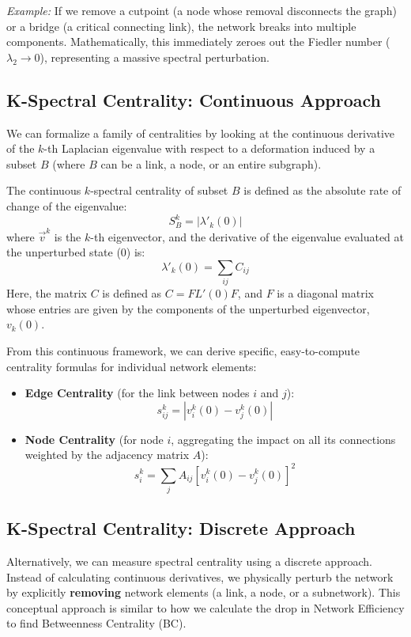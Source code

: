\textit{Example:} If we remove a cutpoint (a node whose removal disconnects the graph) or a bridge (a critical connecting link), the network breaks into multiple components. Mathematically, this immediately zeroes out the Fiedler number (\( \lambda_2 \rightarrow 0 \)), representing a massive spectral perturbation.

\subsection{K-Spectral Centrality: Continuous Approach}
We can formalize a family of centralities by looking at the continuous derivative of the \( k \)-th Laplacian eigenvalue with respect to a deformation induced by a subset \( B \) (where \( B \) can be a link, a node, or an entire subgraph).

The continuous \( k \)-spectral centrality of subset \( B \) is defined as the absolute rate of change of the eigenvalue:
\[
    S^k_B = |\lambda'_k(0)|
\]
where \( \vec{v}^k \) is the \( k \)-th eigenvector, and the derivative of the eigenvalue evaluated at the unperturbed state (0) is:
\[
    \lambda'_k(0) = \sum_{ij} C_{ij}
\]
Here, the matrix \( C \) is defined as \( C = FL'(0)F \), and \( F \) is a diagonal matrix whose entries are given by the components of the unperturbed eigenvector, \( v_k(0) \).

From this continuous framework, we can derive specific, easy-to-compute centrality formulas for individual network elements:
\begin{itemize}
    \item \textbf{Edge Centrality} (for the link between nodes \( i \) and \( j \)):
          \[
              s^k_{ij} = \left| v^k_i(0) - v^k_j(0) \right|
          \]
    \item \textbf{Node Centrality} (for node \( i \), aggregating the impact on all its connections weighted by the adjacency matrix \( A \)):
          \[
              s^k_i = \sum_j A_{ij} \left[ v^k_i(0) - v^k_j(0) \right]^2
          \]
\end{itemize}

\subsection{K-Spectral Centrality: Discrete Approach}
Alternatively, we can measure spectral centrality using a discrete approach. Instead of calculating continuous derivatives, we physically perturb the network by explicitly \textbf{removing} network elements (a link, a node, or a subnetwork). This conceptual approach is similar to how we calculate the drop in Network Efficiency to find Betweenness Centrality (BC).

